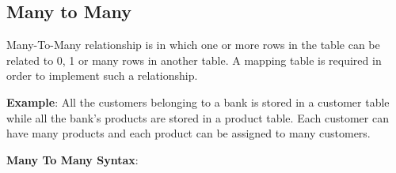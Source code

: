 	\subsection{Many to Many}
	Many-To-Many relationship is in which one or more rows in the table can be related to 0, 1 or many rows in another table. A mapping table is required in order to implement  such a relationship.

	\textbf{Example}: All the customers belonging to a bank is stored in a customer table while all the bank's products are stored in a product table. Each customer can have many products and each product can be assigned to many customers.
	
	\textbf{Many To Many Syntax}: 
		


